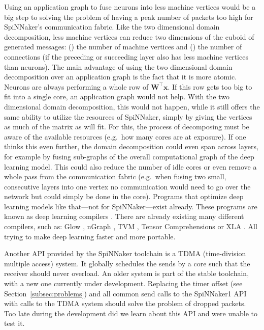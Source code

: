 \documentclass[]{article}
\begin{document}
Using an application graph to fuse neurons into less machine vertices
would be a big step to solving the problem of having a peak number of
packets too high for SpiNNaker's communication fabric.
Like the two dimensional domain decomposition, less machine vertices
can reduce two dimensions of the cuboid of generated messages:
() the number of machine vertices and ()
the number of connections (if the preceding or succeeding layer also
has less machine vertices than neurons).
The main advantage of using the two dimensional domain decomposition
over an application graph is the fact that it is more atomic.
Neurons are always performing a whole row of
$\mathbf{W}^\top\mathbf{x}$.
If this row gets too big to fit into a single core, an application
graph would not help.
With the two dimensional domain decomposition, this would not happen,
while it still offers the same ability to utilize the resources of
SpiNNaker, simply by giving the vertices as much of the matrix as will
fit.
For this, the process of decomposing must be aware of the available
resources (e.g.\ how many cores are at exposure).
If one thinks this even further, the domain decomposition could even
span across layers, for example by fusing sub-graphs of the
overall computational graph of the deep learning model.
This could also reduce the number of idle cores or even remove
a whole pass from the communication fabric (e.g.\ when fusing two
small, consecutive layers into one vertex no communication would need
to go over the network but could simply be done in the core).
Programs that optimize deep learning models like that---not for
SpiNNaker---exist already.
These programs are known as deep learning compilers
\citep{li_et_al_2020}.
There are already existing many different compilers, such as:
Glow \citep{rotem_et_al_2018}, nGraph \citep{cyphers_et_al_2018},
TVM \citep{chen_et_al_2018}, Tensor Comprehensions
\citep{vasilache_et_al_2018} or XLA \citep{leary_et_al_2017}.
All trying to make deep learning faster and more portable.

Another API provided by the SpiNNaker toolchain is a TDMA
(time-division multiple access) system.
It globally schedules the sends by a core such that the receiver
should never overload.
An older system is part of the stable toolchain, with a new one
currently under development.
Replacing the timer offset (see Section~\ref{subsec:problems}) and all
common send calls to the SpiNNaker1 API with calls to the TDMA system
should solve the problem of dropped packets.
Too late during the development did we learn about this API and were
unable to test it.
\end{document}
